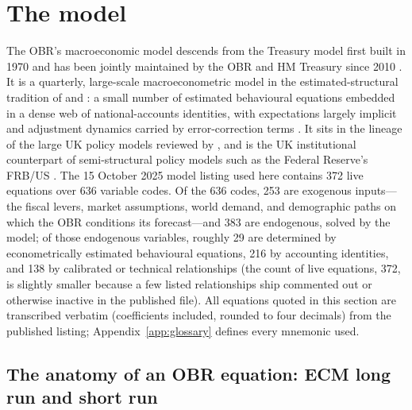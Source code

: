 \section{The model}
\label{sec:model}

The OBR's macroeconomic model descends from the Treasury model first built in 1970 and has been jointly maintained by the OBR and HM Treasury since 2010 \citep{obr2013model, obrmou}. It is a quarterly, large-scale macroeconometric model in the estimated-structural tradition of \citet{klein1950} and \citet{fair2004}: a small number of estimated behavioural equations embedded in a dense web of national-accounts identities, with expectations largely implicit and adjustment dynamics carried by error-correction terms \citep{davidson1978, engle1987}. It sits in the lineage of the large UK policy models reviewed by \citet{wallis1987}, and is the UK institutional counterpart of semi-structural policy models such as the Federal Reserve's FRB/US \citep{brayton1996}. The 15 October 2025 model listing used here contains 372 live equations over 636 variable codes. Of the 636 codes, 253 are exogenous inputs---the fiscal levers, market assumptions, world demand, and demographic paths on which the OBR conditions its forecast---and 383 are endogenous, solved by the model; of those endogenous variables, roughly 29 are determined by econometrically estimated behavioural equations, 216 by accounting identities, and 138 by calibrated or technical relationships (the count of live equations, 372, is slightly smaller because a few listed relationships ship commented out or otherwise inactive in the published file). All equations quoted in this section are transcribed verbatim (coefficients included, rounded to four decimals) from the published listing; Appendix~\ref{app:glossary} defines every mnemonic used.

\subsection{The anatomy of an OBR equation: ECM long run and short run}
\label{sec:ecm}

